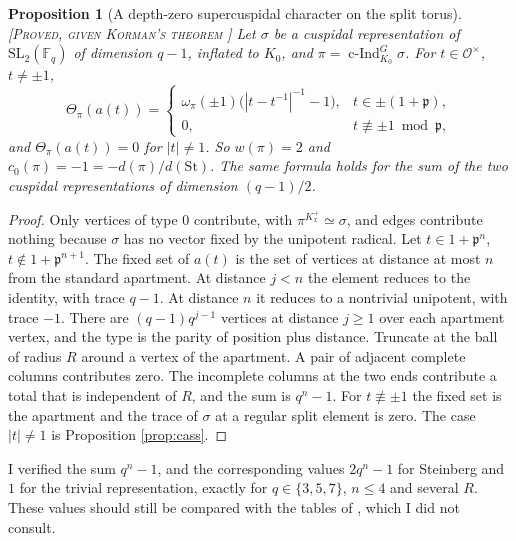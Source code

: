 \documentclass[12pt,letterpaper]{amsart}
\numberwithin{equation}{section}
\newtheorem{proposition}[theorem]{Proposition}
\theoremstyle{definition}
\theoremstyle{remark}
\newcommand{\St}{\mathrm{St}}
\newcommand{\status}[1]{\textup{[\textsc{#1}]}}
\begin{document}
\begin{proposition}[A depth-zero supercuspidal character on the split torus]\label{prop:sc}\status{Proved, given Korman's theorem \cite{Ko04}}
Let $\sigma$ be a cuspidal representation of $\mathrm{SL}_2(\mathbb F_q)$ of dimension $q-1$, inflated to $K_0$, and $\pi=\operatorname{c-Ind}_{K_0}^G\sigma$. For $t\in\mathcal O^\times$, $t\ne\pm1$,
\[
\Theta_\pi(a(t))=\begin{cases}\omega_\pi(\pm1)\bigl(|t-t^{-1}|^{-1}-1\bigr),&t\in\pm(1+\mathfrak p),\\ 0,&t\not\equiv\pm1\bmod\mathfrak p,\end{cases}
\]
and $\Theta_\pi(a(t))=0$ for $|t|\ne1$. So $w(\pi)=2$ and $c_0(\pi)=-1=-d(\pi)/d(\St)$. The same formula holds for the sum of the two cuspidal representations of dimension $(q-1)/2$.
\end{proposition}
\begin{proof}
Only vertices of type $0$ contribute, with $\pi^{K_x^+}\simeq\sigma$, and edges contribute nothing because $\sigma$ has no vector fixed by the unipotent radical. Let $t\in1+\mathfrak p^n$, $t\notin1+\mathfrak p^{n+1}$. The fixed set of $a(t)$ is the set of vertices at distance at most $n$ from the standard apartment. At distance $j<n$ the element reduces to the identity, with trace $q-1$. At distance $n$ it reduces to a nontrivial unipotent, with trace $-1$. There are $(q-1)q^{j-1}$ vertices at distance $j\ge1$ over each apartment vertex, and the type is the parity of position plus distance. Truncate at the ball of radius $R$ around a vertex of the apartment. A pair of adjacent complete columns contributes zero. The incomplete columns at the two ends contribute a total that is independent of $R$, and the sum is $q^n-1$. For $t\not\equiv\pm1$ the fixed set is the apartment and the trace of $\sigma$ at a regular split element is zero. The case $|t|\ne1$ is Proposition \ref{prop:cass}.
\end{proof}
I verified the sum $q^n-1$, and the corresponding values $2q^n-1$ for Steinberg and $1$ for the trivial representation, exactly for $q\in\{3,5,7\}$, $n\le4$ and several $R$. These values should still be compared with the tables of \cite{SS68,ADSS11}, which I did not consult.
\end{document}
